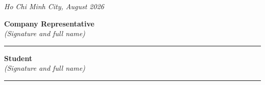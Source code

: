 \textit{Ho Chi Minh City, August 2026}
\vspace{1cm}

\begin{center}

\begin{minipage}[t]{0.4\textwidth}
    \centering
    \textbf{Company Representative}\\[0.2cm]
    \textit{(Signature and full name)}

    \vspace{2.5cm}

    \rule{0.8\linewidth}{0.4pt}
\end{minipage}
\hfill
\begin{minipage}[t]{0.4\textwidth}
    \centering
    \textbf{Student}\\[0.2cm]
    \textit{(Signature and full name)}

    \vspace{2.5cm}

    \rule{0.8\linewidth}{0.4pt}
\end{minipage}
\end{center}